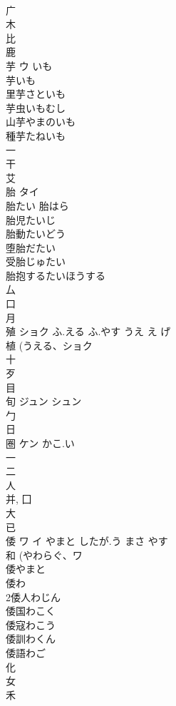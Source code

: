 \documentclass[8pt]{extreport}
\begin{document}
\begin{CJK}{UTF8}{min}
\\	广 
\\	木 
\\	比 
\\	鹿 
\\	芋	ウ	いも	
\\	芋いも 
\\	里芋さといも 
\\	芋虫いもむし 
\\	山芋やまのいも 
\\	種芋たねいも 
\\	一 
\\	干 
\\	艾 
\\	胎	タイ		
\\	胎たい 胎はら 
\\	胎児たいじ 
\\	胎動たいどう 
\\	堕胎だたい 
\\	受胎じゅたい 
\\	胎抱するたいほうする 
\\	厶 
\\	口 
\\	月 
\\	殖	ショク	ふ.える ふ.やす うえ え げ	
\\	植 (うえる、ショク 
\\	十 
\\	歹 
\\	目 
\\	旬	ジュン シュン		
\\	勹 
\\	日 
\\	圏	ケン	かこ.い	
\\	一 
\\	二 
\\	人 
\\	并, 囗 
\\	大 
\\	已 
\\	倭	ワ イ	やまと したが.う まさ やす	
\\	和 (やわらぐ、ワ 
\\	倭やまと
\\	倭わ
\\	2倭人わじん
\\	倭国わこく
\\	倭寇わこう
\\	倭訓わくん
\\	倭語わご
\\	化 
\\	女 
\\	禾 

\end{CJK}
\end{document}
